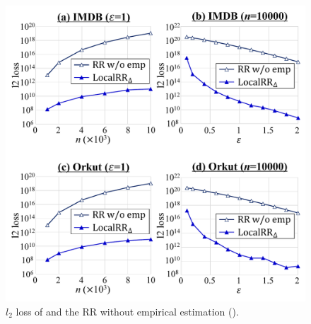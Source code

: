 
\begin{figure}[t]
\centering
\includegraphics[width=0.99\linewidth]{fig/res5_RR_wo_emp.pdf}
\vspace{-5mm}
\caption{$l_2$ loss of  and the RR without empirical estimation ().}
\label{chap1-fig:res5_RR_wo_emp}
\end{figure}

